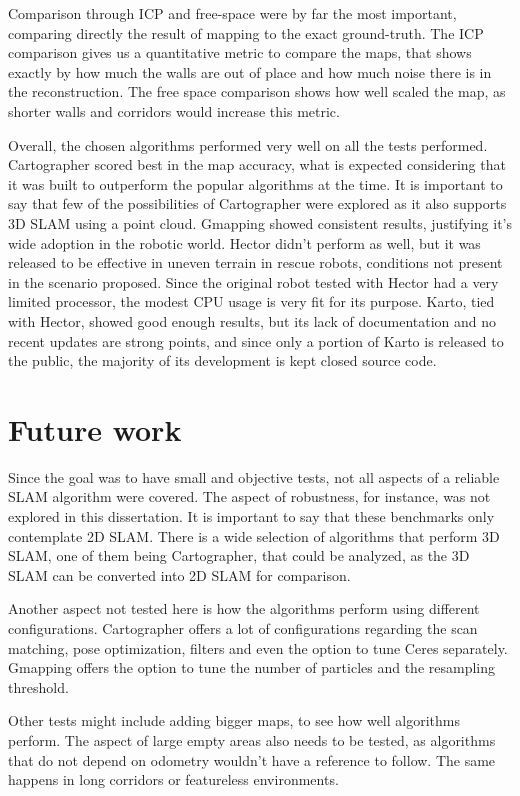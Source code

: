 Comparison through ICP and free-space were by far the most important, comparing directly the result of mapping to the exact ground-truth. The ICP comparison gives us a quantitative metric to compare the maps, that shows exactly by how much the walls are out of place and how much noise there is in the reconstruction. The free space comparison shows how well scaled the map, as shorter walls and corridors would increase this metric.

Overall, the chosen algorithms performed very well on all the tests performed. Cartographer scored best in the map accuracy, what is expected considering that it was built to outperform the popular algorithms at the time. It is important to say that few of the possibilities of Cartographer were explored as it also supports 3D SLAM using a point cloud. Gmapping showed consistent results, justifying it's wide adoption in the robotic world. Hector didn't perform as well, but it was released to be effective in uneven terrain in rescue robots, conditions not present in the scenario proposed. Since the original robot tested with Hector had a very limited processor, the modest CPU usage is very fit for its purpose. Karto, tied with Hector, showed good enough results, but its lack of documentation and no recent updates are strong points, and since only a portion of Karto is released to the public, the majority of its development is kept closed source code.

\section{Future work}

Since the goal was to have small and objective tests, not all aspects of a reliable SLAM algorithm were covered. The aspect of robustness, for instance, was not explored in this dissertation. It is important to say that these benchmarks only contemplate 2D SLAM. There is a wide selection of algorithms that perform 3D SLAM, one of them being Cartographer, that could be analyzed, as the 3D SLAM can be converted into 2D SLAM for comparison.

Another aspect not tested here is how the algorithms perform using different configurations. Cartographer offers a lot of configurations regarding the scan matching, pose optimization, filters and even the option to tune Ceres separately. Gmapping offers the option to tune the number of particles and the resampling threshold.

Other tests might include adding bigger maps, to see how well algorithms perform. The aspect of large empty areas also needs to be tested, as algorithms that do not depend on odometry wouldn't have a reference to follow. The same happens in long corridors or featureless environments.

